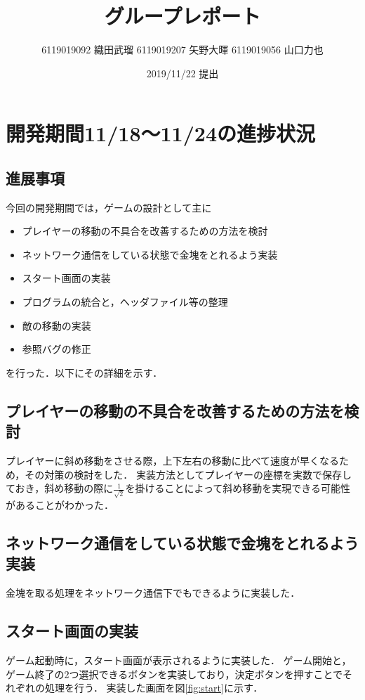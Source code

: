 \documentclass{jarticle}
\title{グループレポート}
\author{6119019092 織田武瑠 6119019207 矢野大暉 6119019056 山口力也}
\date{2019/11/22 提出}
\begin{document}
\maketitle

\section{開発期間11/18～11/24の進捗状況} 

\subsection{進展事項}
今回の開発期間では，ゲームの設計として主に
\begin{itemize}
\item プレイヤーの移動の不具合を改善するための方法を検討
\item ネットワーク通信をしている状態で金塊をとれるよう実装
\item スタート画面の実装
\item プログラムの統合と，ヘッダファイル等の整理
\item 敵の移動の実装
\item 参照バグの修正
\end{itemize}
を行った．以下にその詳細を示す．

\subsection{プレイヤーの移動の不具合を改善するための方法を検討}
プレイヤーに斜め移動をさせる際，上下左右の移動に比べて速度が早くなるため，その対策の検討をした．
実装方法としてプレイヤーの座標を実数で保存しておき，斜め移動の際に$\frac{1}{\sqrt2}$を掛けることによって斜め移動を実現できる可能性があることがわかった．

\subsection{ネットワーク通信をしている状態で金塊をとれるよう実装}
金塊を取る処理をネットワーク通信下でもできるように実装した．

\subsection{スタート画面の実装}
ゲーム起動時に，スタート画面が表示されるように実装した．
ゲーム開始と，ゲーム終了の2つ選択できるボタンを実装しており，決定ボタンを押すことでそれぞれの処理を行う．
実装した画面を図\ref{fig:start}に示す．
\end{document}
